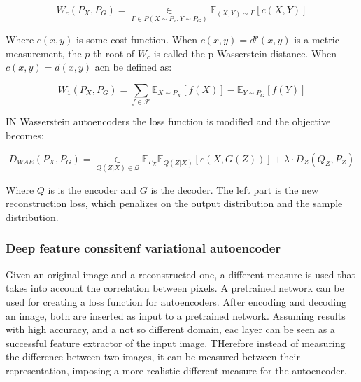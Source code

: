 			$$W_c(P_X, P_G) = \in\limits_{\Gamma\in P(X\sim P_x, Y\sim P_G)}\mathbb{E}_{(X, Y)\sim\Gamma}[c(X, Y)]$$

			Where $c(x, y)$ is some cost function.
			When $c(x,y) = d^p(x, y)$ is a metric measurement, the $p$-th root of $W_c$ is called the p-Wasserstein distance.
			When $c(x, y) = d(x, y)$ acn be defined as:

			$$W_1(P_X, P_G) = \sum\limits_{f\in\mathcal{F}} \mathbb{E}_{X\sim P_X}[f(X)] - \mathbb{E}_{Y\sim P_G}[f(Y)]$$

			IN Wasserstein autoencoders the loss function is modified and the objective becomes:

			$$D_{WAE}(P_X, P_G) = \in\limits_{Q(Z|X)\in\mathcal{Q}}\mathbb{E}_{P_X}\mathbb{E}_{Q(Z|X)}[c(X, G(Z))] + \lambda\cdot D_Z(Q_Z, P_Z)$$

			Where $Q$ is is the encoder and $G$ is the decoder.
			The left part is the new reconstruction loss, which penalizes on the output distribution and the sample distribution.

		\subsubsection{Deep feature conssitenf variational autoencoder}
		Given an original image and a reconstructed one, a different measure is used that takes into account the correlation between pixels.
		A pretrained network can be used for creating a loss function for autoencoders.
		After encoding and decoding an image, both are inserted as input to a pretrained network.
		Assuming results with high accuracy, and a not so different domain, eac layer can be seen as a successful feature extractor of the input image.
		THerefore instead of measuring the difference between two images, it can be measured between their representation, imposing a more realistic different measure for the autoencoder.
